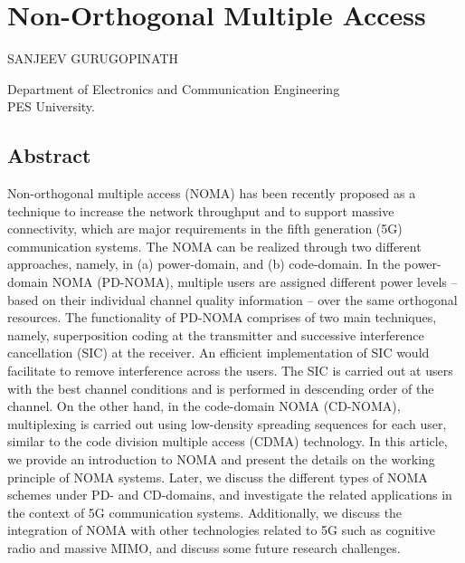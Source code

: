 \chapter{Non-Orthogonal Multiple Access}

\begin{center}
{\large\uppercase{Sanjeev Gurugopinath}} 

\vskip -6pt

Department of Electronics and Communication Engineering\\ 
PES University.
\end{center}
\vskip 1cm

\noindent{}
\newpage

\begin{multicols}{2}

\section*{Abstract}

Non-orthogonal multiple access (NOMA) has been recently proposed as a technique to increase the network throughput and to support massive connectivity, which are major requirements in the fifth generation (5G) communication systems. The NOMA can be realized through two different approaches, namely, in (a) power-domain, and (b) code-domain. In the power-domain NOMA (PD-NOMA), multiple users are assigned different power levels -- based on their individual channel quality information -- over the same orthogonal resources. The functionality of PD-NOMA comprises of two main techniques, namely, superposition coding at the transmitter and successive interference cancellation (SIC) at the receiver. An efficient implementation of SIC would facilitate to remove interference across the users. The SIC is carried out at users with the best channel conditions and is performed in descending order of the channel. On the other hand, in the code-domain NOMA (CD-NOMA), multiplexing is carried out using low-density spreading sequences for each user, similar to the code division multiple access (CDMA) technology. In this article, we provide an introduction to NOMA and present the details on the working principle of NOMA systems. Later, we discuss the different types of NOMA schemes under PD- and CD-domains, and investigate the related applications in the context of 5G communication systems. Additionally, we discuss the integration of NOMA with other technologies related to 5G such as cognitive radio and massive MIMO, and discuss some future research challenges.




\end{multicols}
